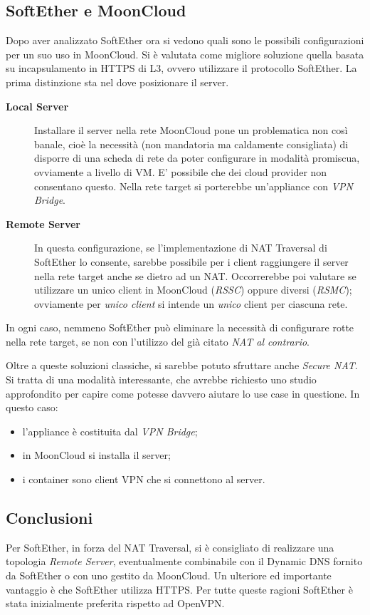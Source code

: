 \subsection{SoftEther e MoonCloud}
Dopo aver analizzato SoftEther ora si vedono quali sono le possibili configurazioni per un suo uso in MoonCloud.
Si è valutata come migliore soluzione quella basata su incapsulamento in HTTPS di L3, ovvero utilizzare
il protocollo SoftEther.
La prima distinzione sta nel dove posizionare il server.
\begin{description}
  \item[\textbf{Local Server}]Installare il server nella rete MoonCloud pone un problematica
  non così banale, cioè la necessità (non mandatoria ma caldamente consigliata) di
  disporre di una scheda di rete da poter configurare in modalità promiscua, ovviamente
  a livello di VM. E' possibile che dei cloud provider non consentano questo.
  Nella rete target si porterebbe un'appliance con \textit{VPN Bridge}.
  \item[\textbf{Remote Server}]In questa configurazione, se l'implementazione
  di NAT Traversal di SoftEther lo consente, sarebbe possibile per i client raggiungere
  il server nella rete target anche se dietro ad un NAT. Occorrerebbe poi valutare se utilizzare
  un unico client in MoonCloud (\textit{RSSC}) oppure diversi (\textit{RSMC}); ovviamente
  per \textit{unico client} si intende un \textit{unico} client per ciascuna rete.
\end{description}
In ogni caso, nemmeno SoftEther può eliminare la necessità di configurare rotte
nella rete target, se non con l'utilizzo del già citato \textit{NAT al contrario}.

Oltre a queste soluzioni classiche, si sarebbe potuto sfruttare anche \textit{Secure NAT}.
Si tratta di una modalità interessante, che avrebbe richiesto uno studio approfondito
per capire come potesse davvero aiutare lo use case in questione.
In questo caso:
  \begin{itemize}
    \item l'appliance è costituita dal \textit{VPN Bridge};
    \item in MoonCloud si installa il server;
    \item i container sono client VPN che si connettono al server.
  \end{itemize}


\subsection{Conclusioni}
Per SoftEther, in forza del NAT Traversal, si è consigliato di realizzare una topologia
\textit{Remote Server}, eventualmente combinabile con il Dynamic DNS fornito
da SoftEther o con uno gestito da MoonCloud.
Un ulteriore ed importante vantaggio è che SoftEther utilizza HTTPS. Per tutte queste
ragioni SoftEther è stata inizialmente preferita rispetto ad OpenVPN.

